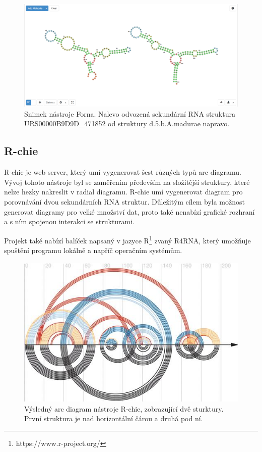 \begin{figure}[H]
  \centering
  \includegraphics[width=140mm]{../img/kap01/tools/forna.png}
  \caption{Snimek nástroje Forna. Nalevo odvozená sekundární RNA
  struktura URS00000B9D9D\_471852 od struktury d.5.b.A.madurae napravo.}
\end{figure}

\subsection{R-chie} 

R-chie \cite{Rchie} je web server, který umí vygenerovat šest různých typů arc
diagramu. Vývoj tohoto nástroje byl se zaměřením především na složitější
struktury, které nelze hezky nakreslit v radial diagramu. R-chie umí
vygenerovat diagram pro porovnávání dvou sekundárních RNA struktur. Důležitým
cílem byla možnost generovat diagramy pro velké množství dat, proto také
nenabízí grafické rozhraní a s ním spojenou interakci se strukturami. 

Projekt také nabízí balíček napsaný v jazyce
R\footnote{https://www.r-project.org/} zvaný R4RNA, který umožňuje spuštění
programu lokálně a napříč operačním systémům.

\begin{figure}[H]
  \centering
  \includegraphics[width=140mm]{../img/kap01/tools/rchie.jpeg}
  \caption{Výsledný arc diagram nástroje R-chie, zobrazující dvě sturktury.
  První struktura je nad horizontální čárou a druhá pod ní.}
\end{figure}

